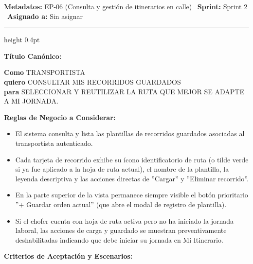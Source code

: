 \documentclass[a4paper,9pt]{article}
\begin{document}
\begin{tcolorbox}[hucard, title={\textbf{HU-63: MOSTRAR RECORRIDOS GUARDADOS} \hfill \scriptsize \colorbox{tealstatus}{\textbf{\ Accepted\ }} \quad \colorbox{white}{\textcolor{primarydark}{\textbf{\ 3 pts\ }}}}]
\vspace{-1pt}
\noindent\textbf{\footnotesize Metadatos:} EP-06 (Consulta y gestión de itinerarios en calle) \textbar\ \textbf{Sprint:} Sprint 2 \textbar\ \textbf{Asignado a:} Sin asignar\par\vspace{2pt}
\hrule height 0.4pt\par\vspace{3pt}
\noindent\textbf{\footnotesize Título Canónico:}\par\vspace{1pt}
{\small \textbf{Como} TRANSPORTISTA \\ \textbf{quiero} CONSULTAR MIS RECORRIDOS GUARDADOS \\ \textbf{para} SELECCIONAR Y REUTILIZAR LA RUTA QUE MEJOR SE ADAPTE A MI JORNADA.}\par\vspace{3pt}
\noindent\textbf{\footnotesize Reglas de Negocio a Considerar:}\par\vspace{1pt}
{\footnotesize
\begin{itemize}[leftmargin=12pt, nosep, itemsep=1.5pt, topsep=1pt]
\item El sistema consulta y lista las plantillas de recorridos guardados asociadas al transportista autenticado.
\item Cada tarjeta de recorrido exhibe su ícono identificatorio de ruta (o tilde verde si ya fue aplicado a la hoja de ruta actual), el nombre de la plantilla, la leyenda descriptiva y las acciones directas de ''Cargar'' y ''Eliminar recorrido''.
\item En la parte superior de la vista permanece siempre visible el botón prioritario ''+ Guardar orden actual'' (que abre el modal de registro de plantilla).
\item Si el chofer cuenta con hoja de ruta activa pero no ha iniciado la jornada laboral, las acciones de carga y guardado se muestran preventivamente deshabilitadas indicando que debe iniciar su jornada en Mi Itinerario.
\end{itemize}
}\par\vspace{3pt}
\noindent\textbf{\footnotesize Criterios de Aceptación y Escenarios:}\par\vspace{2pt}

\end{tcolorbox}
\end{document}
